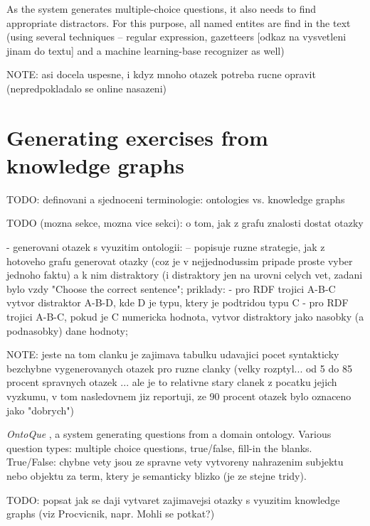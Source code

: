 \documentclass[a4paper, 12pt, twoside]{fithesis2}		%
\renewcommand{\_}{\leavevmode \kern0.0em\vbox{\hrule width0.4em}}
\newcounter{choice}
\begin{document}
As the system generates multiple-choice questions,
it also needs to find appropriate distractors.
For this purpose, all named entites are find in the text
(using several techniques -- regular expression, gazetteers [odkaz na vysvetleni jinam do textu] and a machine learning-base recognizer as well)


NOTE: asi docela uspesne, i kdyz mnoho otazek potreba rucne opravit (nepredpokladalo se online nasazeni)



\section{Generating exercises from knowledge graphs}
\label{sec:irt}

TODO: definovani a sjednoceni terminologie: ontologies vs. knowledge graphs

TODO (mozna sekce, mozna vice sekci): o tom, jak z grafu znalosti dostat otazky

- generovani otazek s vyuzitim ontologii:
\cite{question-gen-domain-ontologies} -- popisuje ruzne strategie, jak z hotoveho grafu generovat otazky (coz je v nejjednodussim pripade proste vyber jednoho faktu) a k nim distraktory (i distraktory jen na urovni celych vet, zadani bylo vzdy "Choose the correct sentence"; priklady:
- pro RDF trojici A-B-C vytvor distraktor A-B-D, kde D je typu, ktery je podtridou typu C
- pro RDF trojici A-B-C, pokud je C numericka hodnota, vytvor distraktory jako nasobky (a podnasobky) dane hodnoty;

NOTE: jeste na tom clanku je zajimava tabulku udavajici pocet syntakticky bezchybne vygenerovanych otazek pro ruzne clanky (velky rozptyl... od 5 do 85 procent spravnych otazek ... ale je to relativne stary clanek z pocatku jejich vyzkumu, v tom nasledovnem jiz reportuji, ze 90 procent otazek bylo oznaceno jako "dobrych")

\textit{OntoQue} \cite{ontoque}, a system generating questions from a domain ontology.
Various question types: multiple choice questions, true/false, fill-in the blanks.
True/False: chybne vety jsou ze spravne vety vytvoreny nahrazenim subjektu nebo objektu za term, ktery je semanticky blizko (je ze stejne tridy).


TODO: popsat jak se daji vytvaret zajimavejsi otazky s vyuzitim knowledge graphs (viz Procvicnik, napr. Mohli se potkat?)


\end{document}
